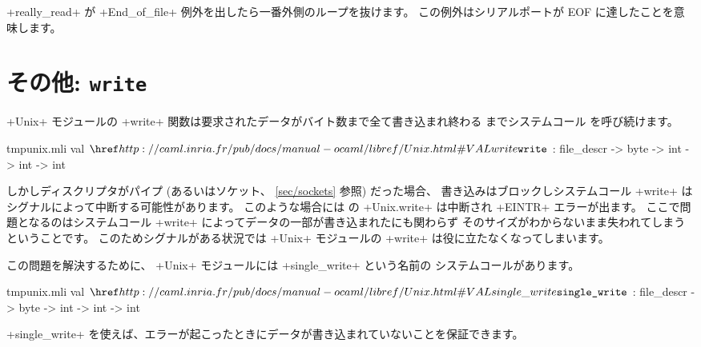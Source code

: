 \begin{example}
\ml+really_read+ が \ml+End_of_file+ 例外を出したら一番外側のループを抜けます。
この例外はシリアルポートが EOF に達したことを意味します。
\end{example}

\section{\label{single_write}その他: \texttt{write}}

\ml+Unix+ モジュールの \ml+write+ 関数は要求されたデータがバイト数まで全て書き込まれ終わる
までシステムコール  を呼び続けます。
\begin{listingcodefile}{tmpunix.mli}
val $\libvalue{Unix}{write}$ : file_descr -> byte -> int -> int -> int
\end{listingcodefile}
%
しかしディスクリプタがパイプ (あるいはソケット、 \ref{sec/sockets} 参照) だった場合、
書き込みはブロックしシステムコール \ml+write+ はシグナルによって中断する可能性があります。
このような場合には \ocaml の \ml+Unix.write+ は中断され \ml+EINTR+ エラーが出ます。
ここで問題となるのはシステムコール \ml+write+ によってデータの一部が書き込まれたにも関わらず
そのサイズがわからないまま失われてしまうということです。
このためシグナルがある状況では \ml+Unix+ モジュールの \ml+write+ は役に立たなくなってしまいます。

この問題を解決するために、 \ml+Unix+ モジュールには \ml+single_write+ という名前の 
システムコールがあります。
\begin{listingcodefile}{tmpunix.mli}
val $\libvalue{Unix}{single\_write}$ : file_descr -> byte -> int -> int -> int
\end{listingcodefile}
\ml+single_write+ を使えば、エラーが起こったときにデータが書き込まれていないことを保証できます。


